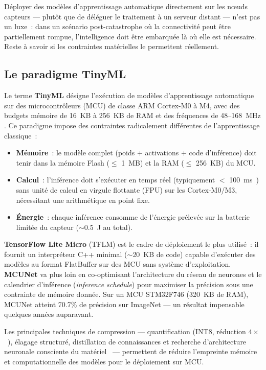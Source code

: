 Déployer des modèles d'apprentissage automatique directement sur les n\oe{}uds capteurs --- plutôt que de déléguer le traitement à un serveur distant --- n'est pas un luxe~: dans un scénario post-catastrophe où la connectivité peut être partiellement rompue, l'intelligence doit être embarquée là où elle est nécessaire. Reste à savoir si les contraintes matérielles le permettent réellement.

\subsection{Le paradigme TinyML}

Le terme \textbf{TinyML} désigne l'exécution de modèles d'apprentissage automatique sur des microcontrôleurs (MCU) de classe ARM Cortex-M0 à M4, avec des budgets mémoire de 16~KB à 256~KB de RAM et des fréquences de 48--168~MHz \cite{Warden2020TinyML,tinyml_review_acm2024}. Ce paradigme impose des contraintes radicalement différentes de l'apprentissage classique~:

\begin{itemize}
    \item \textbf{Mémoire}~: le modèle complet (poids + activations + code d'inférence) doit tenir dans la mémoire Flash ($\leq$ 1~MB) et la RAM ($\leq$ 256~KB) du MCU.
    \item \textbf{Calcul}~: l'inférence doit s'exécuter en temps réel (typiquement $<$ 100~ms~\cite{Warden2020TinyML}) sans unité de calcul en virgule flottante (FPU) sur les Cortex-M0/M3, nécessitant une arithmétique en point fixe.
    \item \textbf{Énergie}~: chaque inférence consomme de l'énergie prélevée sur la batterie limitée du capteur ($\sim$0.5~J au total).
\end{itemize}

\textbf{TensorFlow Lite Micro} (TFLM) \cite{david2021tensorflow} est le cadre de déploiement le plus utilisé~: il fournit un interpréteur C++ minimal ($\sim$20~KB de code) capable d'exécuter des modèles au format FlatBuffer sur des MCU sans système d'exploitation. \textbf{MCUNet} \cite{Lin2020MCUNet} va plus loin en co-optimisant l'architecture du réseau de neurones et le calendrier d'inférence (\emph{inference schedule}) pour maximiser la précision sous une contrainte de mémoire donnée. Sur un MCU STM32F746 (320~KB de RAM), MCUNet atteint 70.7\% de précision sur ImageNet --- un résultat impensable quelques années auparavant.

Les principales techniques de compression --- quantification (INT8, réduction $4\times$~\cite{Bianchi2021QuantizedGNN}), élagage structuré, distillation de connaissances et recherche d'architecture neuronale consciente du matériel~\cite{Cai2020OFA, Lin2020MCUNet} --- permettent de réduire l'empreinte mémoire et computationnelle des modèles pour le déploiement sur MCU.


